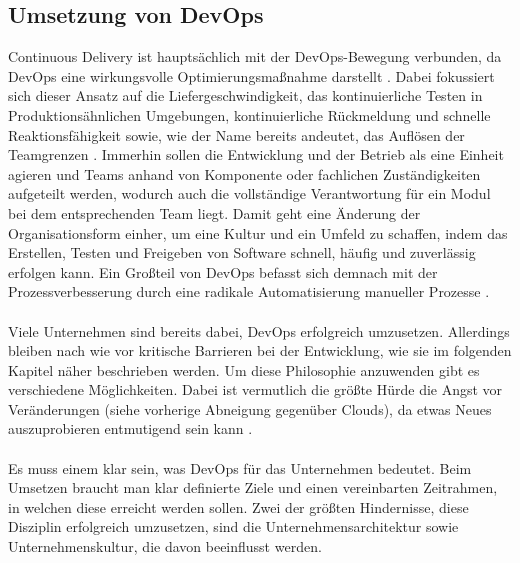 \subsection{Umsetzung von DevOps}
Continuous Delivery ist hauptsächlich mit der DevOps-Bewegung verbunden, da DevOps eine wirkungsvolle Optimierungsmaßnahme darstellt \cite{continuousdelivery.2017}. Dabei fokussiert sich dieser Ansatz auf die Liefergeschwindigkeit, das kontinuierliche Testen in Produktionsähnlichen Umgebungen, kontinuierliche Rückmeldung und schnelle Reaktionsfähigkeit sowie, wie der Name bereits andeutet, das Auflösen der Teamgrenzen \cite{Virmani.2015}. Immerhin sollen die Entwicklung und der Betrieb als eine Einheit agieren und Teams anhand von Komponente oder fachlichen Zuständigkeiten aufgeteilt werden, wodurch auch die vollständige Verantwortung für ein Modul bei dem entsprechenden Team liegt. Damit geht eine Änderung der Organisationsform einher, um eine Kultur und ein Umfeld zu schaffen, indem das Erstellen, Testen und Freigeben von Software schnell, häufig und zuverlässig erfolgen kann. Ein Großteil von DevOps befasst sich demnach mit der Prozessverbesserung durch eine radikale Automatisierung manueller Prozesse \cite{DevOps.2016}.\\ \\Viele Unternehmen sind bereits dabei, DevOps erfolgreich umzusetzen. Allerdings bleiben nach wie vor kritische Barrieren bei der Entwicklung, wie sie im folgenden Kapitel näher beschrieben werden. Um diese Philosophie anzuwenden gibt es verschiedene Möglichkeiten. Dabei ist vermutlich die größte Hürde die Angst vor Veränderungen (siehe vorherige Abneigung gegenüber Clouds), da etwas Neues auszuprobieren entmutigend sein kann \cite{continuousdelivery.2017}. \\ \\Es muss einem klar sein, was DevOps für das Unternehmen bedeutet. Beim Umsetzen braucht man klar definierte Ziele und einen vereinbarten Zeitrahmen, in welchen diese erreicht werden sollen. Zwei der größten Hindernisse, diese Disziplin erfolgreich umzusetzen, sind die Unternehmensarchitektur sowie Unternehmenskultur, die davon beeinflusst werden.

